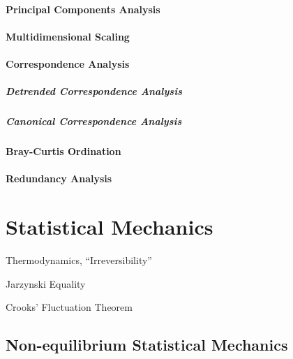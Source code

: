 \paragraph{Principal Components Analysis}
\label{sec:principal_components_analysis}\hfill

\paragraph{Multidimensional Scaling}\label{sec:multidimensional_scaling}\hfill

\paragraph{Correspondence Analysis}\label{sec:correspondence_analysis}\hfill

\subparagraph{Detrended Correspondence Analysis}
\label{sec:detrended_correspondence}\hfill

\subparagraph{Canonical Correspondence Analysis}
\label{sec:canonical_correspondence}\hfill



\paragraph{Bray-Curtis Ordination}\label{sec:bray_curtis_ordination}\hfill

\paragraph{Redundancy Analysis}\label{sec:redundancy_analysis}\hfill



\section{Statistical Mechanics}\label{sec:statistical_mechanics}

Thermodynamics, ``Irreversibility''

Jarzynski Equality

Crooks' Fluctuation Theorem



\subsection{Non-equilibrium Statistical Mechanics}
\label{sec:nonequilibrium_statistical_mechanics}

